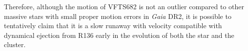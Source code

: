 \documentclass[apjl,twocolumn]{emulateapj}
\newcommand{\SdM}[1]{{{\color{brown}{#1}}}}
\newcommand{\kms}{{\,\mathrm{km\ s^{-1}}}}
\newcommand{\masyr}{\,\mathrm{mas}\,\mathrm{yr}^{-1}}
\DeclareRobustCommand{\Eqref}[1]{Eq.~\ref{#1}}
\DeclareRobustCommand{\Tabref}[1]{Table~\ref{#1}}
\begin{document}
Therefore, although the motion of VFTS682 is not an outlier compared
to other massive stars with small proper motion errors in \emph{Gaia} DR2, it is possible to tentatively claim that it is
a slow runaway with velocity compatible with dynamical ejection from
R136 early in the evolution of both the star and the cluster. 








\end{document}
